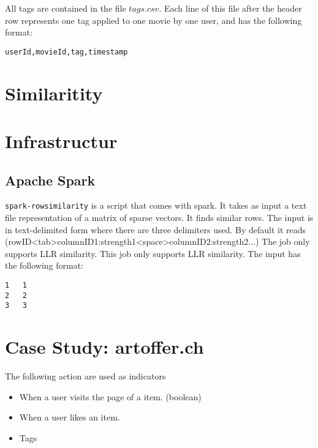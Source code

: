 \documentclass[twoside,a4paper]{article}
\begin{document}
All tags are contained in the file $tags.csv$. Each line of this file after the header row represents one tag applied to one movie by one user, and has the following format:
\begin{verbatim}
userId,movieId,tag,timestamp
\end{verbatim}

\section{Similaritity}
\label{sec:similarity}



\section{Infrastructur}
\label{sec:infrastructur}


\subsection{Apache Spark}
\label{sec:spark}
\verb|spark-rowsimilarity| is a script that comes with spark. It takes as input a text file representation of a matrix of sparse vectors. It finds similar rows. The input is in text-delimited form where there are three delimiters used. By default it reads (rowID<tab>columnID1:strength1<space>columnID2:strength2...) The job only supports LLR similarity. This job only supports LLR similarity.
The input has the following format:
\begin{verbatim}
1	1
2	2
3	3 
\end{verbatim}

\section{Case Study: artoffer.ch}
\label{sec:artoffer}

The following action are used as indicators
\begin{itemize}
\item When a user visits the page of a item. (boolean)
\item When a user likes an item.
\item Tags
\end{itemize}


\end{document}
